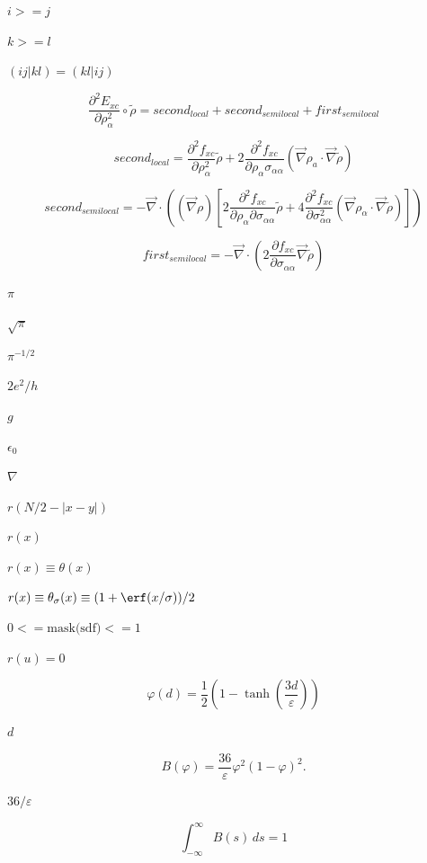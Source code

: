 \documentclass{article}
\begin{document}
$i>=j$
\pagebreak

$k>=l$
\pagebreak

$(ij|kl)=(kl|ij)$
\pagebreak

\[
  \frac{\partial^2E_{xc}}{\partial \rho_\alpha^2}\circ\tilde\rho
     = second_{local} + second_{semilocal} + first_{semilocal}
\]
\pagebreak

\[
       second_{local} = \frac{\partial^2 f_{xc}}{\partial \rho_\alpha^2}\tilde \rho
       + 2\frac{\partial^2 f_{xc}}{\partial \rho_\alpha\sigma_{\alpha\alpha}}
           \left(\vec\nabla \rho_a\cdot \vec \nabla\tilde\rho\right)
\]
\pagebreak

\[
     second_{semilocal} = -\vec\nabla\cdot\left((\vec\nabla\rho)
            \left[2\frac{\partial^2 f_{xc}}{\partial\rho_\alpha\partial\sigma_{\alpha\alpha}}\tilde\rho
            + 4\frac{\partial^2 f_{xc}}{\partial\sigma_{\alpha\alpha}^2}
               \left(\vec\nabla\rho_\alpha\cdot\vec\nabla\tilde\rho\right)\right]\right)
\]
\pagebreak

\[
     first_{semilocal} =
       -\vec\nabla\cdot\left(2\frac{\partial f_{xc}}{\partial\sigma_{\alpha\alpha}}\vec\nabla\tilde\rho\right)
\]
\pagebreak

$\pi$
\pagebreak

$\sqrt{\pi}$
\pagebreak

$\pi^{-1/2}$
\pagebreak

$ 2e^2/h $
\pagebreak

$ g $
\pagebreak

$\epsilon_0$
\pagebreak

$ \nabla $
\pagebreak

$ r(N/2 - |x-y|) $
\pagebreak

$ r(x) $
\pagebreak

$ r(x) \equiv \theta(x)$
\pagebreak

$ r(x) \equiv \theta_\sigma(x) \equiv (1 + \erf(x/\sigma))/2 $
\pagebreak

$0 <=  \mbox{mask(sdf)} <= 1$
\pagebreak

$r(u) = 0$
\pagebreak

\[ \varphi(d) = \frac{1}{2}\left( 1 - \tanh\left(
                 \frac{3d}{\varepsilon} \right) \right) \]
\pagebreak

$d$
\pagebreak

\[ B(\varphi) = \frac{36}{\varepsilon} \varphi^2 (1-\varphi)^2. \]
\pagebreak

$36/\varepsilon$
\pagebreak

\[ \int_{-\infty}^\infty B(s) \, ds = 1 \]
\pagebreak
\end{document}
